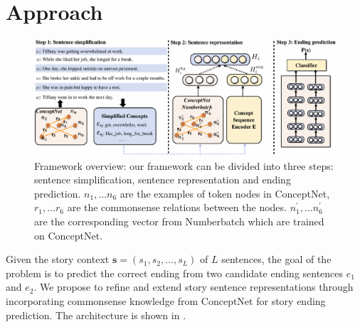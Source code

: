 \section{Approach}
\label{sec:approach}
\begin{figure}
\centering
\includegraphics[width=2\columnwidth]{pictures/model}
\caption{Framework overview: our framework can be divided into three steps: 
sentence simplification, sentence representation and ending prediction. 
${n_1,...n_6}$ are the examples of token nodes in ConceptNet, 
${r_1,...r_6}$  are the commonsense relations between the nodes. 
${n_1^{'},...n_6^{'}}$ are the corresponding vector from Numberbatch
 which are trained on ConceptNet.
}
\label{fig:model}
\end{figure}



Given the story context $\textbf{s} = (s_1, s_2, ..., s_L)$ of $L$ sentences,
the goal of the problem is to predict the correct ending from 
two candidate ending sentences $e_1$ and $e_2$.
We propose to refine and extend story sentence representations
through incorporating commonsense knowledge from ConceptNet for story ending prediction.
The architecture is shown in .

